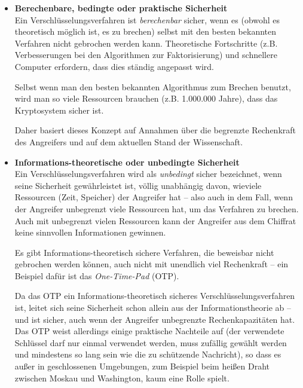 \begin{itemize}

\item {\bfseries Berechenbare, bedingte oder praktische Sicherheit}\\
  Ein Verschlüsselungsverfahren ist {\em berechenbar} sicher, wenn es (obwohl
  es theoretisch möglich ist, es zu brechen) selbst mit den besten bekannten
  Verfahren nicht gebrochen werden kann. Theoretische Fortschritte (z.B.
  Verbesserungen bei den Algorithmen zur Faktorisierung) und schnellere
  Computer erfordern, dass dies ständig angepasst wird. 

  Selbst wenn man den besten bekannten Algorithmus zum Brechen benutzt, wird
  man so viele Ressourcen brauchen (z.B. 1.000.000 Jahre), dass das Kryptosystem
  sicher ist.

  Daher basiert dieses Konzept auf Annahmen über die begrenzte Rechenkraft des
  Angreifers und auf dem aktuellen Stand der Wissenschaft.

\item {\bfseries  Informations-theoretische oder unbedingte Sicherheit}\\
  Ein Verschlüsselungsverfahren wird als {\em unbedingt} sicher bezeichnet,
  wenn seine Sicherheit gewährleistet ist, völlig unabhängig davon, wieviele
  Ressourcen (Zeit, Speicher) der Angreifer hat -- also auch in dem Fall,
  wenn der Angreifer unbegrenzt viele Ressourcen hat, um das
  Verfahren zu brechen. Auch mit unbegrenzt vielen Ressourcen kann der
  Angreifer aus dem Chiffrat keine sinnvollen Informationen gewinnen.

  Es gibt Informations-theoretisch sichere Verfahren, die beweisbar nicht
  gebrochen werden können, auch nicht mit unendlich viel Rechenkraft -- ein
  Beispiel dafür ist das {\em One-Time-Pad} (OTP).

  Da das OTP ein Informations-theoretisch sicheres Verschlüsselungsverfahren
  ist, leitet sich seine Sicherheit schon allein aus der Informationstheorie
  ab -- und ist sicher, auch wenn der Angreifer unbegrenzte Rechenkapazitäten
  hat. Das OTP weist allerdings einige praktische Nachteile auf (der
  verwendete Schlüssel darf nur einmal verwendet werden, muss zufällig
  gewählt werden und mindestens so lang sein wie die zu schützende Nachricht),
  so dass es außer in geschlossenen Umgebungen, zum Beispiel beim heißen
  Draht zwischen Moskau und Washington, kaum eine Rolle spielt.%

\end{itemize}



